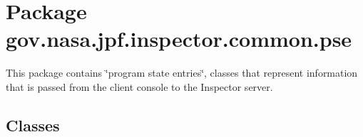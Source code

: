 \hypertarget{namespacegov_1_1nasa_1_1jpf_1_1inspector_1_1common_1_1pse}{}\section{Package gov.\+nasa.\+jpf.\+inspector.\+common.\+pse}
\label{namespacegov_1_1nasa_1_1jpf_1_1inspector_1_1common_1_1pse}


This package contains \char`\"{}program state entries\char`\"{}, classes that represent information that is passed from the client console to the Inspector server.  


\subsection*{Classes}
